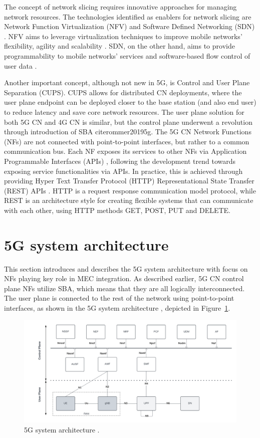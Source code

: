 \documentclass[12pt,a4paper,twoside]{report}
\begin{document}
The concept of network slicing requires innovative approaches for managing network resources. The technologies identified as enablers for network slicing are Network Function Virtualization (NFV) and Software Defined Networking (SDN) \cite{yousaf2017nfv}. NFV aims to leverage virtualization techniques to improve mobile networks’ flexibility, agility and scalability \cite{yousaf2017nfv}. SDN, on the other hand, aims to provide programmability to mobile networks’ services and software-based flow control of user data \cite{yousaf2017nfv}. 
  
Another important concept, although not new in 5G, is Control and User Plane Separation (CUPS). CUPS allows for distributed CN deployments, where the user plane endpoint can be deployed closer to the base station (and also end user) to reduce latency and save core network resources. The user plane solution for both 5G CN and 4G CN is similar, but the control plane underwent a revolution through introduction of SBA cite{rommer20195g}. The 5G CN Network Functions (NFs) are not connected with point-to-point interfaces, but rather to a common communication bus. Each NF exposes its services to other NFs via Application Programmable Interfaces (APIs) \cite{rommer20195g}, following the development trend towards exposing service functionalities via APIs. In practice, this is achieved through providing Hyper Text Transfer Protocol (HTTP) Representational State Transfer (REST) APIs \cite{sabella-mec-sw-dev,rommer20195g}. HTTP is a request response communication model protocol, while REST is an architecture style for creating flexible systems that can communicate with each other, using HTTP methods GET, POST, PUT and DELETE.

\section{5G system architecture}
This section introduces and describes the 5G system architecture with focus on NFs playing key role in MEC integration. As described earlier, 5G CN control plane NFs utilize SBA, which means that they are all logically interconnected. The user plane is connected to the rest of the network using point-to-point interfaces, as shown in the 5G system architecture \cite{ETSI:TS:5G}, depicted in Figure~\ref{F:5G-arch}. 

\begin{figure}[ht]
	\centering
	\includegraphics[width=\textwidth]{./images/5G-CN.png}
	\caption{5G system architecture \cite{ETSI:TS:5G}.}
	\label{F:5G-arch}
\end{figure}
\end{document}
